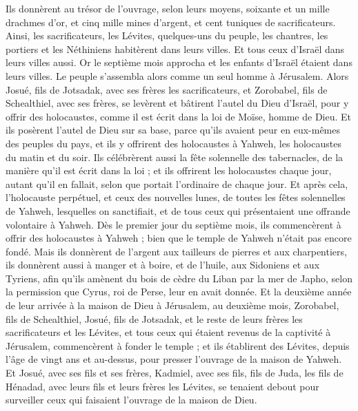 \begin{multicols}{2}
Ils donnèrent au trésor de l'ouvrage, selon leurs moyens, soixante et un mille drachmes d'or, et cinq mille mines d'argent, et cent tuniques de sacrificateurs.
Ainsi, les sacrificateurs, les Lévites, quelques-uns du peuple, les chantres, les portiers et les Néthiniens habitèrent dans leurs villes. Et tous ceux d'Israël dans leurs villes aussi.
\VerseOne{}Or le septième mois approcha et les enfants d'Israël étaient dans leurs villes. Le peuple s'assembla alors comme un seul homme à Jérusalem.
Alors Josué, fils de Jotsadak, avec ses frères les sacrificateurs, et Zorobabel, fils de Schealthiel, avec ses frères, se levèrent et bâtirent l'autel du Dieu d'Israël, pour y offrir des holocaustes, comme il est écrit dans la loi de Moïse, homme de Dieu.
Et ils posèrent l'autel de Dieu sur sa base, parce qu'ils avaient peur en eux-mêmes des peuples du pays, et ils y offrirent des holocaustes à Yahweh, les holocaustes du matin et du soir.
Ils célébrèrent aussi la fête solennelle des tabernacles, de la manière qu'il est écrit dans la loi ; et ils offrirent les holocaustes chaque jour, autant qu'il en fallait, selon que portait l'ordinaire de chaque jour.
Et après cela, l'holocauste perpétuel, et ceux des nouvelles lunes, de toutes les fêtes solennelles de Yahweh, lesquelles on sanctifiait, et de tous ceux qui présentaient une offrande volontaire à Yahweh.
Dès le premier jour du septième mois, ils commencèrent à offrir des holocaustes à Yahweh ; bien que le temple de Yahweh n'était pas encore fondé.
Mais ils donnèrent de l'argent aux tailleurs de pierres et aux charpentiers, ils donnèrent aussi à manger et à boire, et de l'huile, aux Sidoniens et aux Tyriens, afin qu'ils amènent du bois de cèdre du Liban par la mer de Japho, selon la permission que Cyrus, roi de Perse, leur en avait donnée.
Et la deuxième année de leur arrivée à la maison de Dieu à Jérusalem, au deuxième mois, Zorobabel, fils de Schealthiel, Josué, fils de Jotsadak, et le reste de leurs frères les sacrificateurs et les Lévites, et tous ceux qui étaient revenus de la captivité à Jérusalem, commencèrent à fonder le temple ; et ils établirent des Lévites, depuis l'âge de vingt ans et au-dessus, pour presser l'ouvrage de la maison de Yahweh.
Et Josué, avec ses fils et ses frères, Kadmiel, avec ses fils, fils de Juda, les fils de Hénadad, avec leurs fils et leurs frères les Lévites, se tenaient debout pour surveiller ceux qui faisaient l'ouvrage de la maison de Dieu.

\end{multicols}
